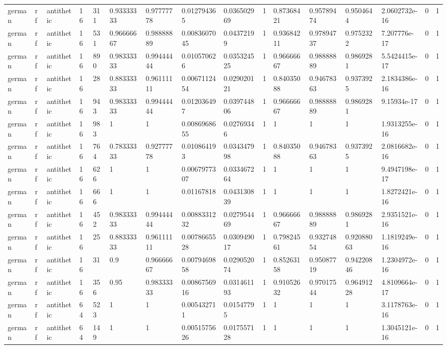 \begin{tabular}{llllllllllllllll}
german & rf & antithetic & 16 & 311 & 0.93333333 & 0.97777778 & 0.012794365 & 0.036502969 & 1 & 0.87368421 & 0.95789474 & 0.9504644 & 2.0602732e-16 & 0 & 1 \\
german & rf & antithetic & 16 & 531 & 0.96666667 & 0.98888889 & 0.0083607045 & 0.04372199 & 1 & 0.93684211 & 0.97894737 & 0.9752322 & 7.207776e-17 & 0 & 1 \\
german & rf & antithetic & 16 & 890 & 0.98333333 & 0.99444444 & 0.010570626 & 0.035324525 & 1 & 0.96666667 & 0.98888889 & 0.9869281 & 5.5424415e-17 & 0 & 1 \\
german & rf & antithetic & 16 & 28 & 0.88333333 & 0.96111111 & 0.0067112454 & 0.029020121 & 1 & 0.84035088 & 0.94678363 & 0.9373925 & 2.1834386e-16 & 0 & 1 \\
german & rf & antithetic & 16 & 943 & 0.98333333 & 0.99444444 & 0.012036497 & 0.039744806 & 1 & 0.96666667 & 0.98888889 & 0.9869281 & 9.15934e-17 & 0 & 1 \\
german & rf & antithetic & 16 & 983 & 1 & 1 & 0.0086968655 & 0.02769346 & 1 & 1 & 1 & 1 & 1.9313255e-16 & 0 & 1 \\
german & rf & antithetic & 16 & 764 & 0.78333333 & 0.92777778 & 0.010864193 & 0.034347998 & 1 & 0.84035088 & 0.94678363 & 0.9373925 & 2.0816682e-16 & 0 & 1 \\
german & rf & antithetic & 16 & 626 & 1 & 1 & 0.0067977307 & 0.033467264 & 1 & 1 & 1 & 1 & 9.4947198e-17 & 0 & 1 \\
german & rf & antithetic & 16 & 666 & 1 & 1 & 0.01167818 & 0.043130839 & 1 & 1 & 1 & 1 & 1.8272421e-16 & 0 & 1 \\
german & rf & antithetic & 16 & 452 & 0.98333333 & 0.99444444 & 0.0088331232 & 0.027954469 & 1 & 0.96666667 & 0.98888889 & 0.9869281 & 2.9351521e-16 & 0 & 1 \\
german & rf & antithetic & 16 & 25 & 0.88333333 & 0.96111111 & 0.0078665528 & 0.030949017 & 1 & 0.79824561 & 0.93274854 & 0.92088063 & 1.1819249e-16 & 0 & 1 \\
german & rf & antithetic & 16 & 31 & 0.9 & 0.96666667 & 0.0079469858 & 0.029052074 & 1 & 0.85263158 & 0.95087719 & 0.94220846 & 1.2304972e-16 & 0 & 1 \\
german & rf & antithetic & 16 & 356 & 0.95 & 0.98333333 & 0.0086756916 & 0.031461193 & 1 & 0.91052632 & 0.97017544 & 0.96491228 & 4.8109664e-17 & 0 & 1 \\
german & rf & antithetic & 64 & 523 & 1 & 1 & 0.005432711 & 0.01547795 & 1 & 1 & 1 & 1 & 3.1178763e-16 & 0 & 1 \\
german & rf & antithetic & 64 & 149 & 1 & 1 & 0.0051575626 & 0.017557128 & 1 & 1 & 1 & 1 & 1.3045121e-16 & 0 & 1 \\

\end{tabular}

